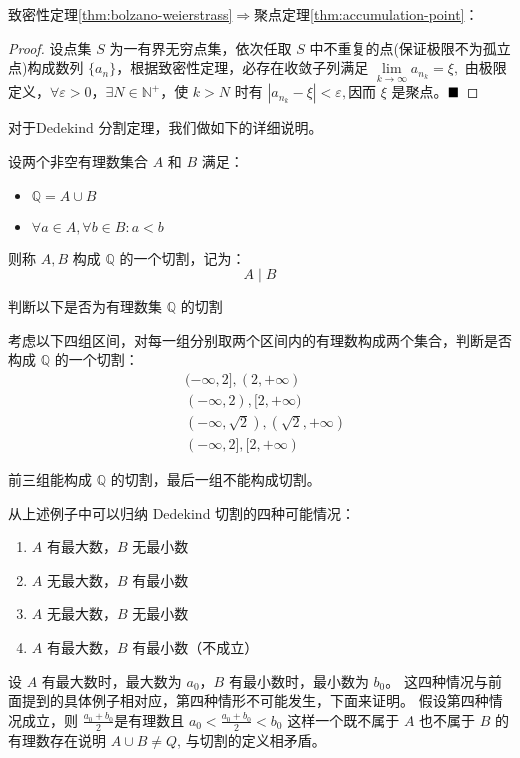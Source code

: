 致密性定理\ref{thm:bolzano-weierstrass}$\Rightarrow$聚点定理\ref{thm:accumulation-point}：
\begin{proof}
    设点集 $S$ 为一有界无穷点集，依次任取 $S$ 中不重复的点(保证极限不为孤立点)构成数列 $\{a_n\}$，根据致密性定理，必存在收敛子列满足 
$\lim\limits_{k \to \infty} a_{n_k} = \xi,$
由极限定义，$\forall \varepsilon > 0$，$\exists N \in \mathbb{N}^+$，使 $k > N$ 时有 
$|a_{n_k} - \xi| < \varepsilon,$因而 $\xi$ 是聚点。$\hfill\blacksquare$
\end{proof}

\newpage 
对于Dedekind 分割定理，我们做如下的详细说明。
    \begin{definition}[有理数集的切割]
    设两个非空有理数集合 $A$ 和 $B$ 满足：

    \begin{itemize}
    \item $ \mathbb{Q} = A \cup B $
    \item $ \forall a \in A, \forall b \in B: a < b $
    \end{itemize}

    则称 $A, B$ 构成 $\mathbb{Q}$ 的一个切割，记为：
    \[
    A \mid B
    \]
    \end{definition}
    \begin{example}
    判断以下是否为有理数集 $\mathbb{Q}$ 的切割

    考虑以下四组区间，对每一组分别取两个区间内的有理数构成两个集合，判断是否构成 $\mathbb{Q}$ 的一个切割：
    \begin{align*}
    & (-\infty, 2] , (2, +\infty) \\
    & (-\infty, 2) , [2, +\infty) \\
    & (-\infty, \sqrt{2}) , (\sqrt{2}, +\infty) \\
    & (-\infty, 2] , [2, +\infty)
    \end{align*}

    前三组能构成 $\mathbb{Q}$ 的切割，最后一组不能构成切割。
    \end{example}
    
    \begin{remark}
        从上述例子中可以归纳 Dedekind 切割的四种可能情况：

        \begin{enumerate}
        \item $A$ 有最大数，$B$ 无最小数
        \item $A$ 无最大数，$B$ 有最小数
        \item $A$ 无最大数，$B$ 无最小数
        \item $A$ 有最大数，$B$ 有最小数（不成立）
        \end{enumerate}

        设 \( A \) 有最大数时，最大数为 \( a_0 \)，\( B \) 有最小数时，最小数为 \( b_0 \)。
        这四种情况与前面提到的具体例子相对应，第四种情形不可能发生，下面来证明。
        假设第四种情况成立，则 $\frac{a_0 + b_0}{2}$是有理数且  
        $a_0 < \frac{a_0 + b_0}{2} < b_0$
        这样一个既不属于 \( A \) 也不属于 \( B \) 的有理数存在说明  
        $A \cup B \neq Q$,
        与切割的定义相矛盾。
    \end{remark}    

